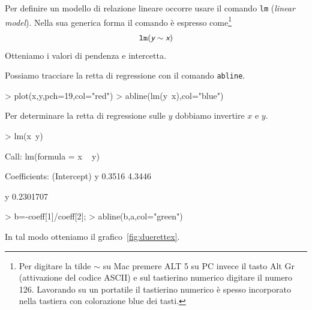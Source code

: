 \documentclass[onecolumn,11pt]{book}
\newcommand{\varia}[1]{\textsl{\textsf{#1}}}
\newcommand{\mytilde}{$\sim$}
\begin{document}
Per definire un modello di relazione lineare occorre usare il comando \texttt{lm} (\varia{linear model}).
Nella sua generica forma il comando \`e espresso come\footnote{ Per digitare la tilde  \mytilde\;  su Mac premere ALT 5 su PC invece il tasto Alt Gr (attivazione del codice ASCII) e sul tastierino numerico digitare il numero 126. Lavorando su un portatile il tastierino numerico \`e spesso incorporato nella tastiera con colorazione blue dei tasti.}
$$\texttt{lm}(\varia{y} \sim  \varia{x})$$
Otteniamo i valori di pendenza e intercetta. 

Possiamo tracciare la retta di regressione con il comando \texttt{abline}.
\begin{Schunk}
\begin{Sinput}
> plot(x,y,pch=19,col="red") 
> abline(lm(y~x),col="blue")
\end{Sinput}
\end{Schunk}
Per determinare  la retta di regressione sulle $y$ dobbiamo invertire $x$ e $y$. 
\begin{Schunk}
\begin{Sinput}
> lm(x~y)
\end{Sinput}
\begin{Soutput}
Call:
lm(formula = x ~ y)

Coefficients:
(Intercept)            y  
     0.3516       4.3446  
\end{Soutput}
\begin{Soutput}
        y 
0.2301707 
\end{Soutput}
\begin{Sinput}
> b=-coeff[1]/coeff[2];
> abline(b,a,col="green")
\end{Sinput}
\end{Schunk}
In tal modo otteniamo il grafico~\ref{fig:duerettex}.
\end{document}
